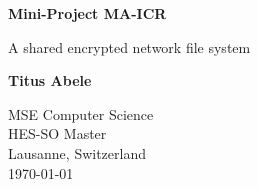 \begin{titlepage}
    \begin{center}
        \vspace*{1cm}
 
        \textbf{Mini-Project MA-ICR}
 
        \vspace{0.5cm}
            A shared encrypted network file system
             
        \vspace{1.5cm}
 
        \textbf{Titus Abele}
 
        \vfill
             
        MSE Computer Science\\
        HES-SO Master\\
        Lausanne, Switzerland\\
        \today
             
    \end{center}
\end{titlepage}